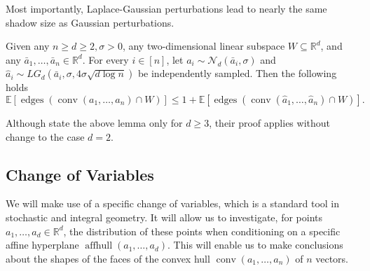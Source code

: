 \documentclass{article}\usepackage[a4paper,margin=20mm]{geometry}
\newcommand{\R}{\mathbb R}
\newcommand{\E}{\mathbb E}
\newcommand{\aff}{\operatorname{affhull}}
\newcommand{\conv}{\operatorname{conv}}
\newcommand{\edges}{\operatorname{edges}}
\renewcommand{\subset}{\subseteq}
\begin{document}
Most importantly, Laplace-Gaussian perturbations lead to nearly the same shadow size as Gaussian perturbations.
\begin{lemma}\label{lem:from-LG-to-Gaussian}
    Given any $n \geq d \geq 2, \sigma > 0$, any two-dimensional linear subspace $W \subset \R^d$, and any $\bar{a}_1,\ldots,\bar{a}_n \in \R^d$.
    For every $i \in [n]$, let $a_i \sim \mathcal{N}_d(\bar{a}_i, \sigma)$
    and $\widehat a_i \sim LG_d(\bar{a}_i, \sigma, 4\sigma \sqrt{d\log n})$ be independently sampled.
    Then the following holds
    \[
         \E\left[ \edges(\conv(a_1 , \ldots, a_n) \cap W) \right]
        \leq 1 + \E \left[ \edges(\conv(\widehat a_1 , \ldots, \widehat a_n) \cap W) \right].
    \]
\end{lemma}
Although \cite{DH18} state the above lemma only for $d \geq 3$, their proof applies without
change to the case $d = 2$.

\subsection{Change of Variables}\label{sec:change-of-variables}

We will make use of a specific change of variables, which is a standard tool in stochastic
and integral geometry.
It will allow us to investigate, for points $a_1,\dots,a_d \in \R^d$,
the distribution of these points when conditioning on a specific affine hyperplane
$\aff(a_1,\dots,a_d)$.
This will enable us to make conclusions about the shapes of the faces of
the convex hull $\conv(a_1,\dots,a_n)$ of $n$ vectors.
\end{document}
